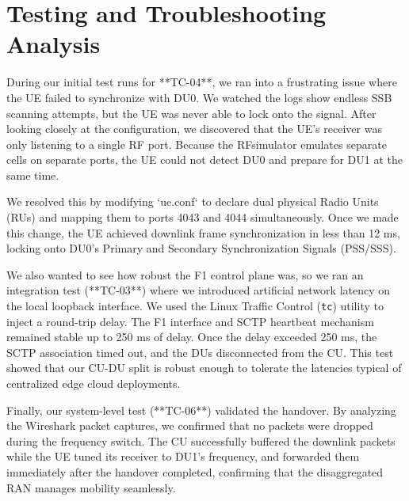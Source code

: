 \section{Testing and Troubleshooting Analysis}
\justify
During our initial test runs for **TC-04**, we ran into a frustrating issue where the UE failed to synchronize with DU0. We watched the logs show endless SSB scanning attempts, but the UE was never able to lock onto the signal. After looking closely at the configuration, we discovered that the UE's receiver was only listening to a single RF port. Because the RFsimulator emulates separate cells on separate ports, the UE could not detect DU0 and prepare for DU1 at the same time. 

We resolved this by modifying `ue.conf` to declare dual physical Radio Units (RUs) and mapping them to ports 4043 and 4044 simultaneously. Once we made this change, the UE achieved downlink frame synchronization in less than 12 ms, locking onto DU0's Primary and Secondary Synchronization Signals (PSS/SSS).

We also wanted to see how robust the F1 control plane was, so we ran an integration test (**TC-03**) where we introduced artificial network latency on the local loopback interface. We used the Linux Traffic Control (\texttt{tc}) utility to inject a round-trip delay. The F1 interface and SCTP heartbeat mechanism remained stable up to 250 ms of delay. Once the delay exceeded 250 ms, the SCTP association timed out, and the DUs disconnected from the CU. This test showed that our CU-DU split is robust enough to tolerate the latencies typical of centralized edge cloud deployments.

Finally, our system-level test (**TC-06**) validated the handover. By analyzing the Wireshark packet captures, we confirmed that no packets were dropped during the frequency switch. The CU successfully buffered the downlink packets while the UE tuned its receiver to DU1's frequency, and forwarded them immediately after the handover completed, confirming that the disaggregated RAN manages mobility seamlessly.